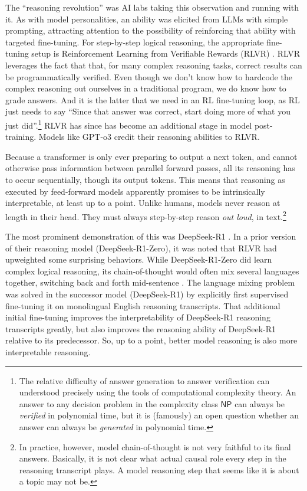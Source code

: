 The ``reasoning revolution'' was AI labs taking this observation and running
with it. As with model personalities, an ability was elicited from LLMs with
simple prompting, attracting attention to the possibility of reinforcing that
ability with targeted fine-tuning. For step-by-step logical reasoning, the
appropriate fine-tuning setup is Reinforcement Learning from Verifiable Rewards
(RLVR) \cite{lambert2025tulu}. RLVR leverages the fact that that, for many
complex reasoning tasks, correct results can be programmatically verified. Even
though we don't know how to hardcode the complex reasoning out ourselves in a
traditional program, we do know how to grade answers. And it is the latter that
we need in an RL fine-tuning loop, as RL just needs to say ``Since that answer
was correct, start doing more of what you just did''.\footnote{The relative
difficulty of answer generation to answer verification can understood precisely
using the tools of computational complexity theory. An answer to any decision
problem in the complexity class $\mathsf{NP}$ can always be \emph{verified} in
polynomial time, but it is (famously) an open question whether an answer can
always be \emph{generated} in polynomial time.} RLVR has since has become an
additional stage in model post-training. Models like GPT-o3 credit their
reasoning abilities to RLVR.

Because a transformer is only ever preparing to output a next token, and cannot
otherwise pass information between parallel forward passes, all its reasoning
has to occur sequentially, though its output tokens. This means that reasoning
as executed by feed-forward models apparently promises to be intrinsically
interpretable, at least up to a point. Unlike humans, models never reason at
length in their head. They must always step-by-step reason \emph{out loud}, in
text.\footnote{In practice, however, model chain-of-thought is not very
faithful to its final answers. Basically, it is not clear what actual causal
role every step in the reasoning transcript plays. A model reasoning step that
seems like it is about a topic may not be.}

The most prominent demonstration of this was DeepSeek-R1
\cite{deepseekai2025deepseek}. In a prior version of their reasoning model
(DeepSeek-R1-Zero), it was noted that RLVR had upweighted some surprising
behaviors. While DeepSeek-R1-Zero did learn complex logical reasoning, its
chain-of-thought would often mix several languages together, switching back and
forth mid-sentence \cite{deepseekai2025deepseek}. The language mixing problem
was solved in the successor model (DeepSeek-R1) by explicitly first supervised
fine-tuning it on monolingual English reasoning transcripts. That additional
initial fine-tuning improves the interpretability of DeepSeek-R1 reasoning
transcripts greatly, but also improves the reasoning ability of DeepSeek-R1
relative to its predecessor. So, up to a point, better model reasoning is also
more interpretable reasoning.

